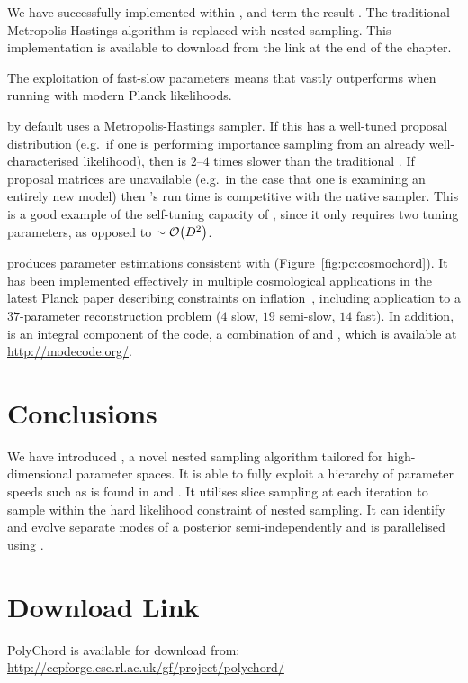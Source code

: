 We have successfully implemented \PolyChord{} within \CosmoMC{}, and term the result \CosmoChord{}.  The traditional Metropolis-Hastings algorithm is replaced with nested sampling. This implementation is available to download from the link at the end of the chapter.

The exploitation of fast-slow parameters means that \CosmoChord{} vastly outperforms \MultiNest{} when running with modern Planck likelihoods. 

\CosmoMC{} by default uses a Metropolis-Hastings sampler. If this has a well-tuned proposal distribution (e.g.\ if one is performing importance sampling from an already well-characterised likelihood), then \PolyChord{} is \(2\)--\(4\) times slower than the traditional \CosmoMC{}. If proposal matrices are unavailable (e.g.\ in the case that one is examining an entirely new model) then \CosmoChord{}'s run time is competitive with the native \CosmoMC{} sampler. This is a good example of the self-tuning capacity of \PolyChord{}, since it only requires two tuning parameters, as opposed to \({\sim\mathcal{O}{\left(D^2\right)}}\).

\CosmoChord{} produces parameter estimations consistent with \CosmoMC{} (Figure~\ref{fig:pc:cosmochord}).
It has been implemented effectively in multiple cosmological applications in the latest Planck paper describing constraints on inflation~\citep{planck2015-a24}, including application to a \(37\)-parameter reconstruction problem (\(4\) slow, \(19\) semi-slow, \(14\) fast). 
In addition, \PolyChord{} is an integral component of the \ModeChord{} code, a combination of \CosmoChord{} and \ModeCode{} \citep{ModeChord1,ModeChord2,ModeChord3}, which is available at \url{http://modecode.org/}.

\section{Conclusions}
\label{sec:pc:conclusions}
We have introduced \PolyChord{}, a novel nested sampling algorithm tailored for high-dimensional parameter spaces. It is able to fully exploit a hierarchy of parameter speeds such as is found in \CosmoMC{} and \CAMB{}. It utilises slice sampling at each iteration to sample within the hard likelihood constraint of nested sampling. It can identify and evolve separate modes of a posterior semi-independently and is parallelised using \openMPI{}.












\section*{Download Link}
PolyChord is available for download from:\\ \url{http://ccpforge.cse.rl.ac.uk/gf/project/polychord/}



